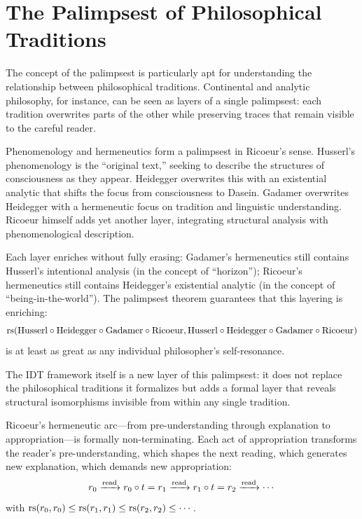 \section{The Palimpsest of Philosophical Traditions}

The concept of the palimpsest is particularly apt for understanding the
relationship between philosophical traditions.  Continental and analytic
philosophy, for instance, can be seen as layers of a single palimpsest:
each tradition overwrites parts of the other while preserving traces that
remain visible to the careful reader.

\begin{interpretation}
\label{interp:palimpsest-phenom-herm}
Phenomenology and hermeneutics form a palimpsest in Ricoeur's sense.
Husserl's phenomenology is the ``original text,'' seeking to describe the
structures of consciousness as they appear.  Heidegger overwrites this
with an existential analytic that shifts the focus from consciousness to
Dasein.  Gadamer overwrites Heidegger with a hermeneutic focus on tradition
and linguistic understanding.  Ricoeur himself adds yet another layer,
integrating structural analysis with phenomenological description.

Each layer enriches without fully erasing: Gadamer's hermeneutics still
contains Husserl's intentional analysis (in the concept of ``horizon'');
Ricoeur's hermeneutics still contains Heidegger's existential analytic
(in the concept of ``being-in-the-world'').  The palimpsest theorem
guarantees that this layering is enriching:
\[
\mathrm{rs}(\text{Husserl} \circ \text{Heidegger} \circ \text{Gadamer} \circ \text{Ricoeur},
\text{Husserl} \circ \text{Heidegger} \circ \text{Gadamer} \circ \text{Ricoeur})
\]
is at least as great as any individual philosopher's self-resonance.

The IDT framework itself is a new layer of this palimpsest: it does not
replace the philosophical traditions it formalizes but adds a formal layer
that reveals structural isomorphisms invisible from within any single
tradition.
\end{interpretation}

\begin{theorem}
\label{thm:ricoeur-infinite-conversation}
Ricoeur's hermeneutic arc---from pre-understanding through explanation to
appropriation---is formally non-terminating.  Each act of appropriation
transforms the reader's pre-understanding, which shapes the next reading,
which generates new explanation, which demands new appropriation:
\[
r_0 \xrightarrow{\text{read}} r_0 \circ t = r_1 \xrightarrow{\text{read}} r_1 \circ t = r_2 \xrightarrow{\text{read}} \cdots
\]
with $\mathrm{rs}(r_0, r_0) \leq \mathrm{rs}(r_1, r_1) \leq \mathrm{rs}(r_2, r_2) \leq \cdots$.
\end{theorem}

